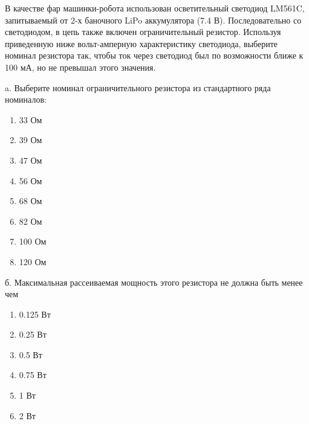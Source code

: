 
В качестве фар машинки-робота использован осветительный светодиод LM561C, запитываемый от 2-х баночного LiPo 
аккумулятора (7.4 В). Последовательно со светодиодом, в цепь также включен ограничительный резистор. 
Используя приведенную ниже вольт-амперную характеристику светодиода, выберите номинал резистора так, 
чтобы ток через светодиод был по возможности ближе к 100 мА, но не превышал этого значения.


a. Выберите номинал ограничительного резистора из стандартного ряда номиналов:

\begin{enumerate}
    \item 33 Ом
    \item 39 Ом
    \item 47 Ом
    \item 56 Ом
    \item 68 Ом
    \item 82 Ом
    \item 100 Ом
    \item 120 Ом
\end{enumerate}

б. Максимальная рассеиваемая мощность этого резистора не должна быть менее чем 

\begin{enumerate}
    \item 0.125 Вт
    \item 0.25 Вт
    \item 0.5 Вт
    \item 0.75 Вт
    \item 1 Вт
    \item 2 Вт
\end{enumerate}